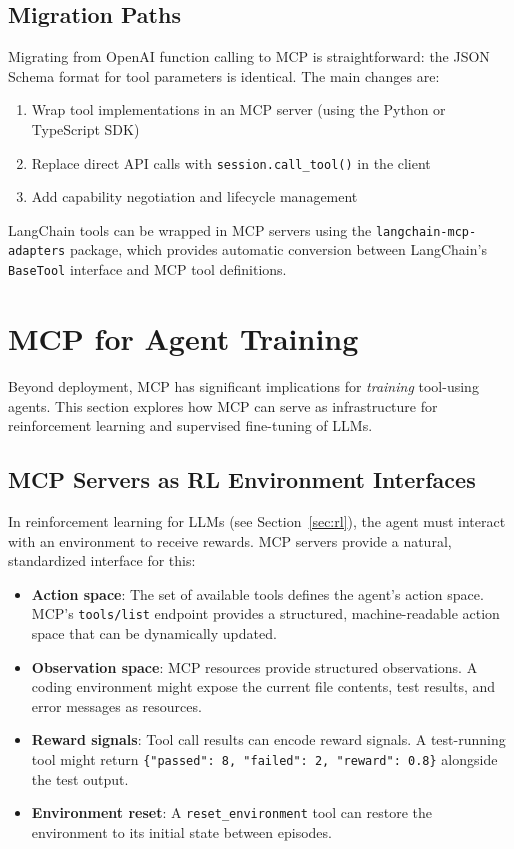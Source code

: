 \subsection{Migration Paths}
\label{migration-paths}

Migrating from OpenAI function calling to MCP is straightforward: the JSON Schema format for tool parameters is identical. The main changes are:

\begin{enumerate}
  \item Wrap tool implementations in an MCP server (using the Python or TypeScript SDK)
  \item Replace direct API calls with \texttt{session.call\_tool()} in the client
  \item Add capability negotiation and lifecycle management
\end{enumerate}

LangChain tools can be wrapped in MCP servers using the \texttt{langchain-mcp-adapters} package, which provides automatic conversion between LangChain’s \texttt{BaseTool} interface and MCP tool definitions.

\section{MCP for Agent Training}
\label{sec:mcp:training}

Beyond deployment, MCP has significant implications for \emph{training} tool-using agents. This section explores how MCP can serve as infrastructure for reinforcement learning and supervised fine-tuning of LLMs.

\subsection{MCP Servers as RL Environment Interfaces}
\label{mcp-servers-as-rl-environment-interfaces}

In reinforcement learning for LLMs (see Section~\ref{sec:rl}), the agent must interact with an environment to receive rewards. MCP servers provide a natural, standardized interface for this:

\begin{itemize}
  \item \textbf{Action space}: The set of available tools defines the agent’s action space. MCP’s \texttt{tools/list} endpoint provides a structured, machine-readable action space that can be dynamically updated.
  \item \textbf{Observation space}: MCP resources provide structured observations. A coding environment might expose the current file contents, test results, and error messages as resources.
  \item \textbf{Reward signals}: Tool call results can encode reward signals. A test-running tool might return \verb|{"passed": 8, "failed": 2, "reward": 0.8}| alongside the test output.
  \item \textbf{Environment reset}: A \texttt{reset\_environment} tool can restore the environment to its initial state between episodes.
\end{itemize}


